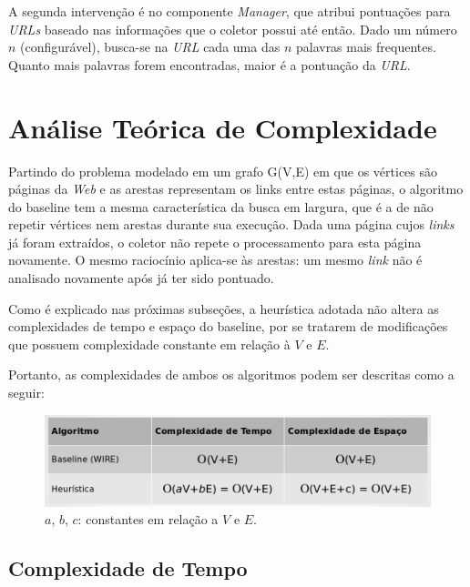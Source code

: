 \documentclass[a4paper,12pt,titlepage]{article}
\begin{document}
A segunda intervenção é no componente \textit{Manager}, que atribui pontuações para \textit{URLs} baseado nas informações que o coletor possui até então. Dado um número $n$ (configurável), busca-se na \textit{URL} cada uma das $n$ palavras mais frequentes. Quanto mais palavras forem encontradas, maior é a pontuação da \textit{URL}.

\section{Análise Teórica de Complexidade}

Partindo do problema modelado em um grafo G(V,E) em que os vértices são páginas da \textit{Web} e as arestas representam os links entre estas páginas, o algoritmo do baseline tem a mesma característica da busca em largura, que é a de não repetir vértices nem arestas durante sua execução. Dada uma página cujos \textit{links} já foram extraídos, o coletor não repete o processamento para esta página novamente. O mesmo raciocínio aplica-se às arestas: um mesmo \textit{link} não é analisado novamente após já ter sido pontuado.

Como é explicado nas próximas subseções, a heurística adotada não altera as complexidades de tempo e espaço do baseline, por se tratarem de modificações que possuem complexidade constante em relação à $V$ e $E$. 

Portanto, as complexidades de ambos os algoritmos podem ser descritas como a seguir:

\begin{figure}[H]
     \centering
     \includegraphics[scale=0.4]{figures/complexity.png}
     \caption{$a$, $b$, $c$: constantes em relação a $V$ e $E$.}
     \label{bsp}
\end{figure}

\subsection{Complexidade de Tempo}
\end{document}
